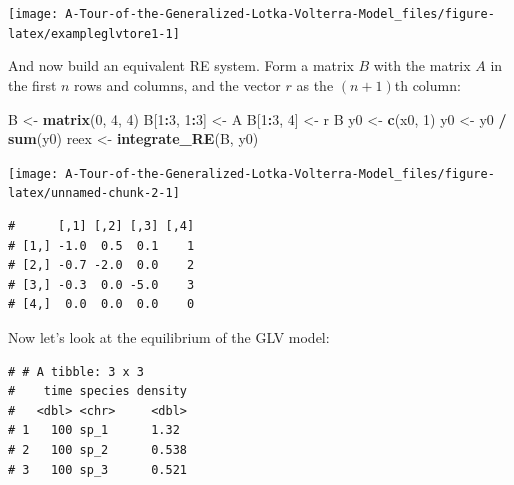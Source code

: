 \documentclass[]{book}
\newenvironment{Shaded}{\begin{snugshade}}{\end{snugshade}}
\newcommand{\DecValTok}[1]{\textcolor[rgb]{0.00,0.00,0.81}{#1}}
\newcommand{\KeywordTok}[1]{\textcolor[rgb]{0.13,0.29,0.53}{\textbf{#1}}}
\newcommand{\NormalTok}[1]{#1}
\newcommand{\OperatorTok}[1]{\textcolor[rgb]{0.81,0.36,0.00}{\textbf{#1}}}
\newcommand{\StringTok}[1]{\textcolor[rgb]{0.31,0.60,0.02}{#1}}
\begin{document}
\begin{center}\texttt{[image: A-Tour-of-the-Generalized-Lotka-Volterra-Model\_files/figure-latex/exampleglvtore1-1]} \end{center}

And now build an equivalent RE system. Form a matrix \(B\) with the matrix \(A\) in the first \(n\) rows and columns, and the vector \(r\) as the \((n+1)\)th column:

\begin{Shaded}
\begin{Highlighting}[]
\NormalTok{B <-}\StringTok{ }\KeywordTok{matrix}\NormalTok{(}\DecValTok{0}\NormalTok{, }\DecValTok{4}\NormalTok{, }\DecValTok{4}\NormalTok{)}
\NormalTok{B[}\DecValTok{1}\OperatorTok{:}\DecValTok{3}\NormalTok{, }\DecValTok{1}\OperatorTok{:}\DecValTok{3}\NormalTok{] <-}\StringTok{ }\NormalTok{A}
\NormalTok{B[}\DecValTok{1}\OperatorTok{:}\DecValTok{3}\NormalTok{, }\DecValTok{4}\NormalTok{] <-}\StringTok{ }\NormalTok{r}
\NormalTok{B}
\NormalTok{y0 <-}\StringTok{ }\KeywordTok{c}\NormalTok{(x0, }\DecValTok{1}\NormalTok{)}
\NormalTok{y0 <-}\StringTok{ }\NormalTok{y0 }\OperatorTok{/}\StringTok{ }\KeywordTok{sum}\NormalTok{(y0)}
\NormalTok{reex <-}\StringTok{ }\KeywordTok{integrate_RE}\NormalTok{(B, y0)}
\end{Highlighting}
\end{Shaded}

\begin{center}\texttt{[image: A-Tour-of-the-Generalized-Lotka-Volterra-Model\_files/figure-latex/unnamed-chunk-2-1]} \end{center}

\begin{verbatim}
#      [,1] [,2] [,3] [,4]
# [1,] -1.0  0.5  0.1    1
# [2,] -0.7 -2.0  0.0    2
# [3,] -0.3  0.0 -5.0    3
# [4,]  0.0  0.0  0.0    0
\end{verbatim}

Now let's look at the equilibrium of the GLV model:

\begin{Shaded}
\end{Shaded}

\begin{verbatim}
# # A tibble: 3 x 3
#    time species density
#   <dbl> <chr>     <dbl>
# 1   100 sp_1      1.32 
# 2   100 sp_2      0.538
# 3   100 sp_3      0.521
\end{verbatim}
\end{document}
